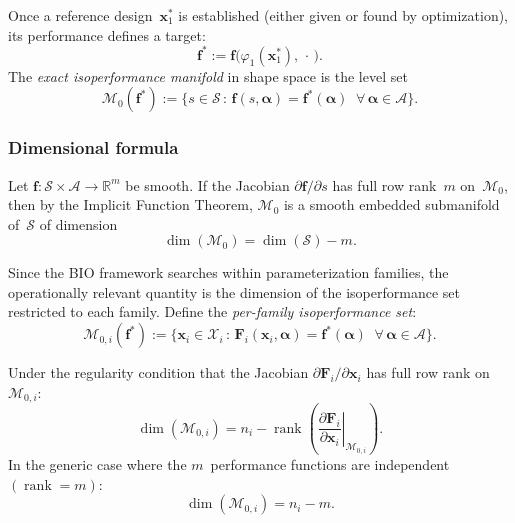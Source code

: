 Once a reference design~$\mathbf{x}_1^*$ is established (either given or found by optimization), its performance defines a target:
\begin{equation}
    \mathbf{f}^* := \mathbf{f}\bigl( \varphi_1(\mathbf{x}_1^*),\, \cdot\, \bigr).
\end{equation}
The \emph{exact isoperformance manifold} in shape space is the level set
\begin{equation}
    \mathcal{M}_0(\mathbf{f}^*)
    := \bigl\{ s \in \mathcal{S} \,:\, \mathbf{f}(s, \boldsymbol{\alpha}) = \mathbf{f}^*(\boldsymbol{\alpha})
    \;\; \forall\, \boldsymbol{\alpha} \in \mathcal{A} \bigr\}.
    \label{eq:exact_manifold}
\end{equation}


\subsubsection{Dimensional formula}

\begin{theorem}
\label{thm:dimension}
Let $\mathbf{f} : \mathcal{S} \times \mathcal{A} \to \mathbb{R}^m$ be smooth. If the Jacobian $\partial \mathbf{f}/\partial s$ has full row rank~$m$ on~$\mathcal{M}_0$, then by the Implicit Function Theorem, $\mathcal{M}_0$ is a smooth embedded submanifold of~$\mathcal{S}$ of dimension
\begin{equation}
    \dim(\mathcal{M}_0) = \dim(\mathcal{S}) - m.
    \label{eq:dim_global}
\end{equation}
\end{theorem}

Since the BIO framework searches within parameterization families, the operationally relevant quantity is the dimension of the isoperformance set restricted to each family. Define the \emph{per-family isoperformance set}:
\begin{equation}
    \mathcal{M}_{0,i}(\mathbf{f}^*)
    := \bigl\{ \mathbf{x}_i \in \mathcal{X}_i \,:\,
    \mathbf{F}_i(\mathbf{x}_i, \boldsymbol{\alpha}) = \mathbf{f}^*(\boldsymbol{\alpha})
    \;\; \forall\, \boldsymbol{\alpha} \in \mathcal{A} \bigr\}.
    \label{eq:family_manifold}
\end{equation}

\begin{corollary}
\label{cor:per_family_dim}
Under the regularity condition that the Jacobian $\partial \mathbf{F}_i / \partial \mathbf{x}_i$ has full row rank on~$\mathcal{M}_{0,i}$:
\begin{equation}
    \dim(\mathcal{M}_{0,i}) = n_i - \operatorname{rank}\!\left( \left.\frac{\partial \mathbf{F}_i}{\partial \mathbf{x}_i}\right|_{\mathcal{M}_{0,i}} \right).
    \label{eq:dim_family}
\end{equation}
In the generic case where the $m$~performance functions are independent $(\operatorname{rank} = m)$:
\begin{equation}
    \dim(\mathcal{M}_{0,i}) = n_i - m.
    \label{eq:dim_family_generic}
\end{equation}
\end{corollary}


